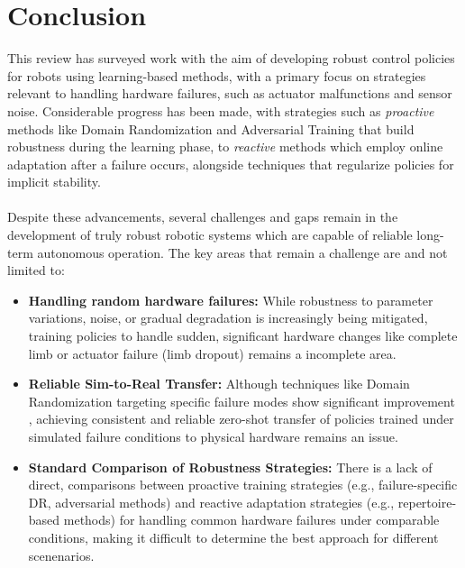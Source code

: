 \documentclass[12pt, a4paper]{article} %
\begin{document}
\section{Conclusion}
\label{sec:conclusion} %

This review has surveyed work with the aim of  developing robust control policies for robots using learning-based methods, with a primary focus on strategies relevant to handling hardware failures, such as actuator malfunctions and sensor noise. Considerable progress has been made, with strategies such as \textit{proactive} methods like Domain Randomization and Adversarial Training that build robustness during the learning phase, to \textit{reactive} methods which employ online adaptation after a failure occurs, alongside techniques that regularize policies for implicit stability.\\\\
\noindent
Despite these advancements, several challenges and gaps remain in the development of truly robust robotic systems which are capable of reliable long-term autonomous operation. The key areas that remain a challenge are and not limited to:\begin{itemize}
    \item \textbf{Handling random hardware failures:} While robustness to parameter variations, noise, or gradual degradation is increasingly being mitigated, training policies to handle sudden, significant hardware changes like complete limb or actuator failure (limb dropout) remains a incomplete area.
    \item \textbf{Reliable Sim-to-Real Transfer:} Although techniques like Domain Randomization targeting specific failure modes show significant improvement \citep{liu2023saving}, achieving consistent and reliable zero-shot transfer of policies trained under simulated failure conditions to physical hardware remains an issue.
    \item \textbf{Standard Comparison of Robustness Strategies:} There is a lack of direct, comparisons between proactive training strategies (e.g., failure-specific DR, adversarial methods) and reactive adaptation strategies (e.g., repertoire-based methods) for handling common hardware failures under comparable conditions, making it difficult to determine the best approach for different scenenarios.
\end{itemize}
\end{document}

